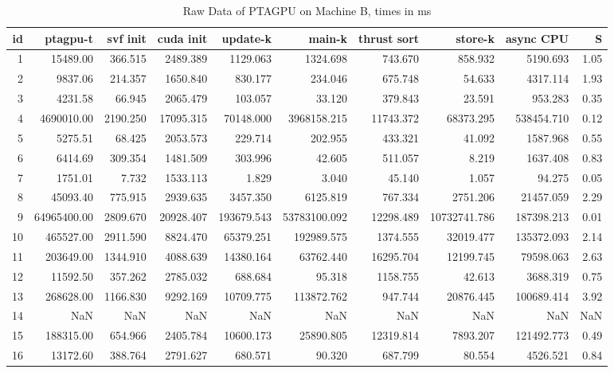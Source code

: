 \begin{table}[ht]
    \tiny
    \begin{tabular}{rrrrrrrrrr}
        \toprule
        id & ptagpu-t    & svf init & cuda init & update-k   & main-k       & thrust sort & store-k      & async CPU  & S    \\
        \midrule
        1  & 15489.00    & 366.515  & 2489.389  & 1129.063   & 1324.698     & 743.670     & 858.932      & 5190.693   & 1.05 \\
        2  & 9837.06     & 214.357  & 1650.840  & 830.177    & 234.046      & 675.748     & 54.633       & 4317.114   & 1.93 \\
        3  & 4231.58     & 66.945   & 2065.479  & 103.057    & 33.120       & 379.843     & 23.591       & 953.283    & 0.35 \\
        4  & 4690010.00  & 2190.250 & 17095.315 & 70148.000  & 3968158.215  & 11743.372   & 68373.295    & 538454.710 & 0.12 \\
        5  & 5275.51     & 68.425   & 2053.573  & 229.714    & 202.955      & 433.321     & 41.092       & 1587.968   & 0.55 \\
        6  & 6414.69     & 309.354  & 1481.509  & 303.996    & 42.605       & 511.057     & 8.219        & 1637.408   & 0.83 \\
        7  & 1751.01     & 7.732    & 1533.113  & 1.829      & 3.040        & 45.140      & 1.057        & 94.275     & 0.05 \\
        8  & 45093.40    & 775.915  & 2939.635  & 3457.350   & 6125.819     & 767.334     & 2751.206     & 21457.059  & 2.29 \\
        9  & 64965400.00 & 2809.670 & 20928.407 & 193679.543 & 53783100.092 & 12298.489   & 10732741.786 & 187398.213 & 0.01 \\
        10 & 465527.00   & 2911.590 & 8824.470  & 65379.251  & 192989.575   & 1374.555    & 32019.477    & 135372.093 & 2.14 \\
        11 & 203649.00   & 1344.910 & 4088.639  & 14380.164  & 63762.440    & 16295.704   & 12199.745    & 79598.063  & 2.63 \\
        12 & 11592.50    & 357.262  & 2785.032  & 688.684    & 95.318       & 1158.755    & 42.613       & 3688.319   & 0.75 \\
        13 & 268628.00   & 1166.830 & 9292.169  & 10709.775  & 113872.762   & 947.744     & 20876.445    & 100689.414 & 3.92 \\
        14 & NaN         & NaN      & NaN       & NaN        & NaN          & NaN         & NaN          & NaN        & NaN  \\
        15 & 188315.00   & 654.966  & 2405.784  & 10600.173  & 25890.805    & 12319.814   & 7893.207     & 121492.773 & 0.49 \\
        16 & 13172.60    & 388.764  & 2791.627  & 680.571    & 90.320       & 687.799     & 80.554       & 4526.521   & 0.84 \\
        \bottomrule
    \end{tabular}
    \caption{Raw Data of PTAGPU on Machine B, times in ms}
\end{table}


